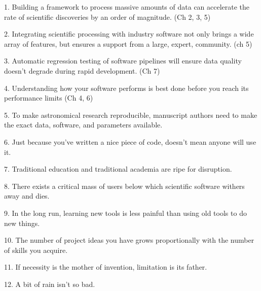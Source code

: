 1. Building a framework to process massive amounts of data can accelerate the rate of scientific discoveries by an order of magnitude. (Ch 2, 3, 5)

2. Integrating scientific processing with industry software not only brings a wide array of features, but ensures a support from a large, expert, community. (ch 5)

3. Automatic regression testing of software pipelines will ensure data quality doesn't degrade during rapid development. (Ch 7)

4. Understanding how your software performs is best done before you reach its performance limits (Ch 4, 6) 

5. To make astronomical research reproducible, manuscript authors need to make the exact data, software, and parameters available.

6. Just because you've written a nice piece of code, doesn't mean anyone will use it.  

7. Traditional education and traditional academia are ripe for disruption. 

8. There exists a critical mass of users below which scientific software withers away and dies.

9. In the long run, learning new tools is less painful than using old tools to do new things. 

10. The number of project ideas you have grows proportionally with the number of skills you acquire.

11. If necessity is the mother of invention, limitation is its father.

12. A bit of rain isn't so bad.
